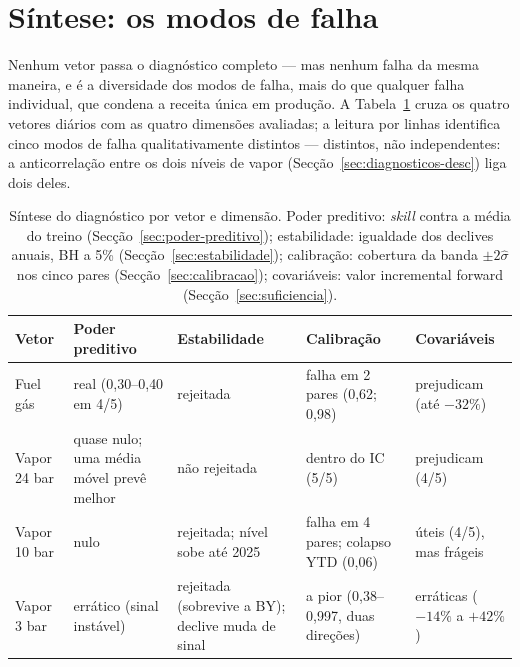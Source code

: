 \section{Síntese: os modos de falha}
\label{sec:sintese-modos-falha}


Nenhum vetor passa o diagnóstico completo --- mas nenhum falha da mesma
maneira, e é a diversidade dos modos de falha, mais do que qualquer falha
individual, que condena a receita única em produção. A
Tabela~\ref{tab:sintese-vectores} cruza os quatro vetores diários com as
quatro dimensões avaliadas; a leitura por linhas identifica cinco modos de
falha qualitativamente distintos --- distintos, não independentes: a
anticorrelação entre os dois níveis de vapor
(Secção~\ref{sec:diagnosticos-desc}) liga dois deles.

\begin{table}[htbp]
  \centering
  \caption[Síntese do diagnóstico por vetor]{Síntese do diagnóstico por
  vetor e dimensão. Poder preditivo: \emph{skill} contra a média do treino
  (Secção~\ref{sec:poder-preditivo}); estabilidade: igualdade dos declives
  anuais, BH a 5\% (Secção~\ref{sec:estabilidade}); calibração: cobertura da
  banda $\pm 2\hat\sigma$ nos cinco pares (Secção~\ref{sec:calibracao});
  covariáveis: valor incremental forward (Secção~\ref{sec:suficiencia}).}
  \label{tab:sintese-vectores}
  \small
  \begin{tabular}{lp{2.5cm}p{2.6cm}p{2.9cm}p{2.9cm}}
    \toprule
    Vetor & Poder preditivo & Estabilidade & Calibração & Covariáveis \\
    \midrule
    Fuel gás & real (0{,}30--0{,}40 em 4/5) & rejeitada & falha em 2 pares (0{,}62; 0{,}98) & prejudicam (até $-32\%$) \\
    Vapor 24 bar & quase nulo; uma média móvel prevê melhor & não rejeitada & dentro do IC (5/5) & prejudicam (4/5) \\
    Vapor 10 bar & nulo & rejeitada; nível sobe até 2025 & falha em 4 pares; colapso YTD (0{,}06) & úteis (4/5), mas frágeis \\
    Vapor 3 bar & errático (sinal instável) & rejeitada (sobrevive a BY); declive muda de sinal & a pior (0{,}38--0{,}997, duas direções) & erráticas ($-14\%$ a $+42\%$) \\
    \bottomrule
  \end{tabular}
\end{table}

